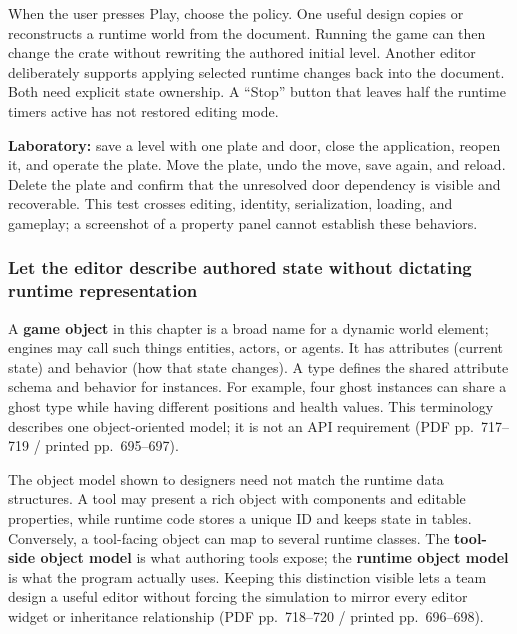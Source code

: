 When the user presses Play, choose the policy. One useful design copies or reconstructs a runtime world from the document. Running the game can then change the crate without rewriting the authored initial level. Another editor deliberately supports applying selected runtime changes back into the document. Both need explicit state ownership. A ``Stop'' button that leaves half the runtime timers active has not restored editing mode.

\textbf{Laboratory:} save a level with one plate and door, close the application, reopen it, and operate the plate. Move the plate, undo the move, save again, and reload. Delete the plate and confirm that the unresolved door dependency is visible and recoverable. This test crosses editing, identity, serialization, loading, and gameplay; a screenshot of a property panel cannot establish these behaviors.

\subsubsection{Let the editor describe authored state without dictating runtime representation}\label{06-engine-ii-ch032-let-the-editor-describe-authored-state-without-dictating-runtime-representation}

A \textbf{game object} in this chapter is a broad name for a dynamic world element; engines may call such things entities, actors, or agents. It has attributes (current state) and behavior (how that state changes). A type defines the shared attribute schema and behavior for instances. For example, four ghost instances can share a ghost type while having different positions and health values. This terminology describes one object-oriented model; it is not an API requirement (PDF pp.~717--719 / printed pp.~695--697).

The object model shown to designers need not match the runtime data structures. A tool may present a rich object with components and editable properties, while runtime code stores a unique ID and keeps state in tables. Conversely, a tool-facing object can map to several runtime classes. The \textbf{tool-side object model} is what authoring tools expose; the \textbf{runtime object model} is what the program actually uses. Keeping this distinction visible lets a team design a useful editor without forcing the simulation to mirror every editor widget or inheritance relationship (PDF pp.~718--720 / printed pp.~696--698).

